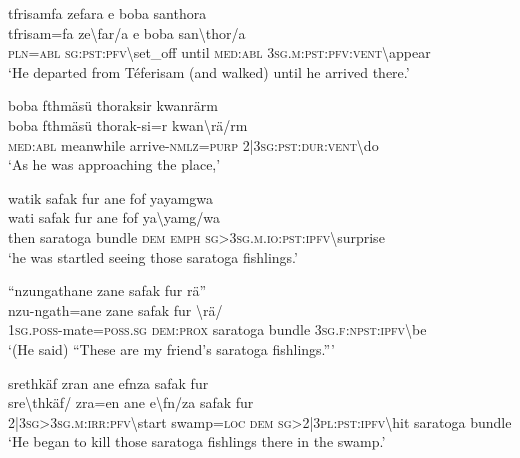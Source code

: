 \ea\label{ex:3:a7562}
tfrisamfa zefara e boba santhora\\
\gll tfrisam=fa	ze{\textbackslash}far/a	e	boba	san{\textbackslash}thor/a\\
     \textsc{pln}=\textsc{abl}	\textsc{sg}:\textsc{pst}:\textsc{pfv}{\textbackslash}set\_off	until	\textsc{med}:\textsc{abl}	3\textsc{sg}.\textsc{m}:\textsc{pst}:\textsc{pfv}:\textsc{vent}{\textbackslash}appear\\
\glt `He departed from Téferisam (and walked) until he arrived there.'
\z

\ea\label{ex:3:a7564}
boba fthmäsü thoraksir kwanrärm\\
\gll boba	fthmäsü	thorak-si=r	kwan{\textbackslash}rä/rm\\
     \textsc{med}:\textsc{abl}	meanwhile	arrive-\textsc{nmlz}=\textsc{purp}	2|3\textsc{sg}:\textsc{pst}:\textsc{dur}:\textsc{vent}{\textbackslash}do\\
\glt `As he was approaching the place,'
\z

\ea\label{ex:3:a7565}
watik safak fur ane fof yayamgwa\\
\gll wati	safak	fur	ane	fof	ya{\textbackslash}yamg/wa\\
     then	saratoga	bundle	\textsc{dem}	\textsc{emph}	\textsc{sg}>3\textsc{sg}.\textsc{m}.\textsc{io}:\textsc{pst}:\textsc{ipfv}{\textbackslash}surprise\\
\glt `he was startled seeing those saratoga fishlings.'
\z

\ea\label{ex:3:a7566}
``nzungathane zane safak fur rä''\\
\gll nzu-ngath=ane	zane	safak	fur	{\textbackslash}rä/\\
     1\textsc{sg}.\textsc{poss}-mate=\textsc{poss}.\textsc{sg}	\textsc{dem}:\textsc{prox}	saratoga	bundle	3\textsc{sg}.\textsc{f}:\textsc{npst}:\textsc{ipfv}{\textbackslash}be\\
\glt `(He said) ``These are my friend's saratoga fishlings.'''
\z

\ea\label{ex:3:a7567}
srethkäf zran ane efnza safak fur\\
\gll sre{\textbackslash}thkäf/	zra=en	ane	e{\textbackslash}fn/za	safak	fur\\
     2|3\textsc{sg}>3\textsc{sg}.\textsc{m}:\textsc{irr}:\textsc{pfv}{\textbackslash}start	swamp=\textsc{loc}	\textsc{dem}	\textsc{sg}>2|3\textsc{pl}:\textsc{pst}:\textsc{ipfv}{\textbackslash}hit	saratoga	bundle\\
\glt `He began to kill those saratoga fishlings there in the swamp.'
\z

